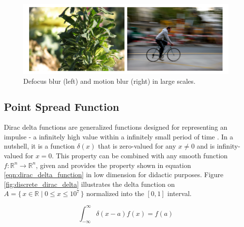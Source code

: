 \begin{figure}[H]
	\centering
	\caption{\label{fig:defocus_motion_blur}Defocus blur (left) and motion blur (right) in large scales.}
	\begin{center}
	    \includegraphics[scale=0.4]{images/fig7.png}
	\end{center}
	\centering
\end{figure}

\subsection{Point Spread Function}

Dirac delta functions are generalized functions designed for representing an impulse - a infinitely high value within a infinitely small period of time \cite{bracewell2000fourier}. In a nutshell, it is a function $\delta(x)$ that is zero-valued for any $x \neq 0$ and is infinity-valued for $x = 0$. This property can be combined with any smooth function $f\colon \mathbb{R}^{n} \to \mathbb{R}^{n}$, given  and provides the property shown in equation \ref{eqn:dirac_delta_function} in low dimension for didactic purposes. Figure \ref{fig:discrete_dirac_delta} illustrates the delta function on  $A = \{\, x\in \mathbb{R} \mid 0\le x\le 10^{7} \,\}$ normalized into the $[0,1]$ interval.

\begin{equation}
    \label{eqn:dirac_delta_function}
      \int^{\infty}_{-\infty}\delta(x-a)f(x) = f(a)
\end{equation}


